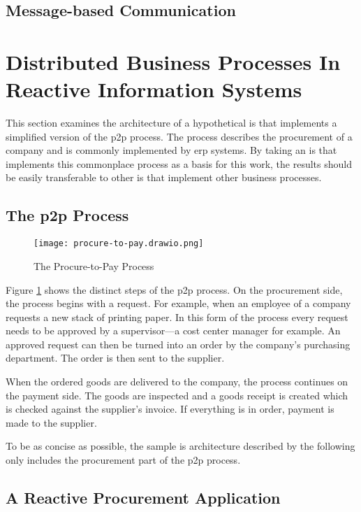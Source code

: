 \subsection{Message-based Communication}

\section{Distributed Business Processes In Reactive Information Systems}\label{sec:problem}

This section examines the architecture of a hypothetical \gls{is} that implements a simplified version of the \gls{p2p} process.
The process describes the procurement of a company and is commonly implemented by \gls{erp} systems.
By taking an \gls{is} that implements this commonplace process as a basis for this work, the results should be easily transferable to other \gls{is} that implement other business processes.

\subsection{The \acrlong{p2p} Process}

\begin{figure}[H]
  \centering
  \texttt{[image: procure-to-pay.drawio.png]}
  \caption{The Procure-to-Pay Process}\label{fig:procure-to-pay}
\end{figure}

Figure \ref{fig:procure-to-pay} shows the distinct steps of the \gls{p2p} process.
On the procurement side, the process begins with a request.
For example, when an employee of a company requests a new stack of printing paper.
In this form of the process every request needs to be approved by a supervisor---a cost center manager for example.
An approved request can then be turned into an order by the company's purchasing department.
The order is then sent to the supplier.

When the ordered goods are delivered to the company, the process continues on the payment side.
The goods are inspected and a goods receipt is created which is checked against the supplier's invoice.
If everything is in order, payment is made to the supplier.

To be as concise as possible, the sample \gls{is} architecture described by the following only includes the procurement part of the \gls{p2p} process.

\subsection{A Reactive Procurement Application}

